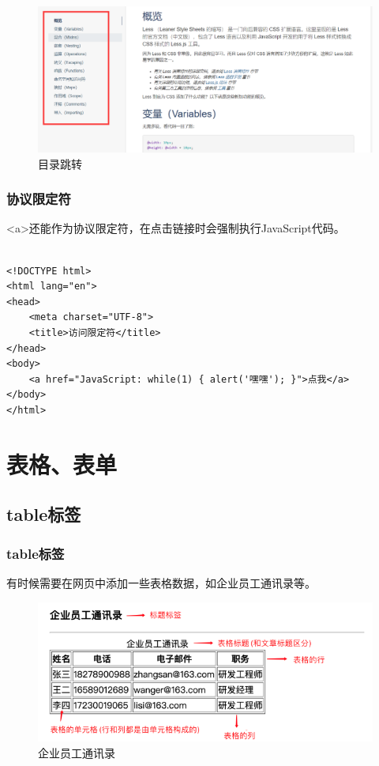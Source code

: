 \begin{figure}[H]
	\centering
	\includegraphics[scale=0.35]{img/C3/3-4/1.png}
	\caption{目录跳转}
\end{figure}

\subsection{协议限定符}

<a>还能作为协议限定符，在点击链接时会强制执行JavaScript代码。 \\

 \\
\begin{lstlisting}[style=htmlcssjs]
<!DOCTYPE html>
<html lang="en">
<head>
    <meta charset="UTF-8">
    <title>访问限定符</title>
</head>
<body>
    <a href="JavaScript: while(1) { alert('嘿嘿'); }">点我</a>
</body>
</html>
\end{lstlisting}

\newpage

\chapter{表格、表单}

\section{table标签}

\subsection{table标签}

有时候需要在网页中添加一些表格数据，如企业员工通讯录等。

\begin{figure}[H]
	\centering
	\includegraphics[scale=0.9]{img/C4/4-1/1.png}
	\caption{企业员工通讯录}
\end{figure}

